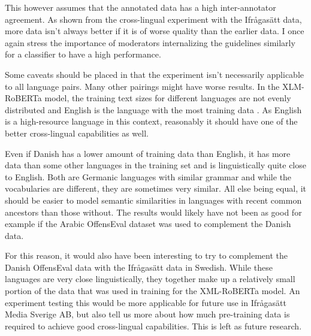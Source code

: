 \documentclass[nofilelist]{cslthse-msc}
\begin{document}
This however assumes that the annotated data has a high inter-annotator agreement. As shown from the cross-lingual experiment with the Ifrågasätt data, more data isn't always better if it is of worse quality than the earlier data. I once again stress the importance of moderators internalizing the guidelines similarly for a classifier to have a high performance.

Some caveats should be placed in that the experiment isn't necessarily applicable to all language pairs. Many other pairings might have worse results. In the XLM-RoBERTa model, the training text sizes for different languages are not evenly distributed and English is the language with the most training data \citep{DBLP:journals/corr/abs-1901-07291}. As English is a high-resource language in this context, reasonably it should have one of the better cross-lingual capabilities as well. 

Even if Danish has a lower amount of training data than English, it has more data than some other languages in the training set and is linguistically quite close to English. Both are Germanic languages with similar grammar and while the vocabularies are different, they are sometimes very similar. All else being equal, it should be easier to model semantic similarities in languages with recent common ancestors than those without. The results would likely have not been as good for example if the Arabic OffensEval dataset was used to complement the Danish data. 

For this reason, it would also have been interesting to try to complement the Danish OffensEval data with the Ifrågasätt data in Swedish. While these languages are very close linguistically, they together make up a relatively small portion of the data that was used in training for the XML-RoBERTa model. An experiment testing this would be more applicable for future use in Ifrågasätt Media Sverige AB, but also tell us more about how much pre-training data is required to achieve good cross-lingual capabilities. This is left as future research.






{}
\end{document}
